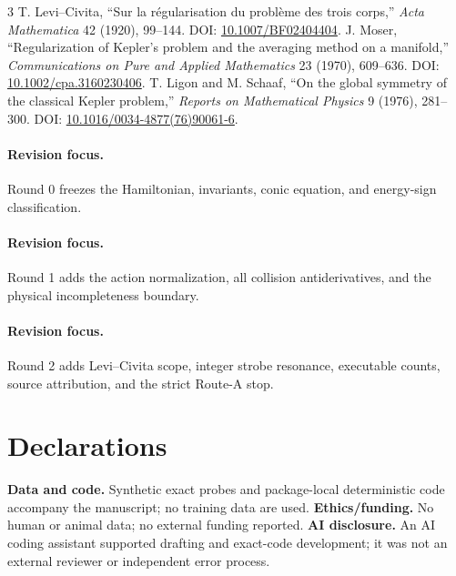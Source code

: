 \documentclass[9pt]{extarticle}
\begin{document}
\begin{thebibliography}{3}
\footnotesize
\setlength{\itemsep}{0pt}
 T. Levi--Civita, ``Sur la régularisation du problème des
trois corps,'' \emph{Acta Mathematica} 42 (1920), 99--144.
DOI: \href{https://doi.org/10.1007/BF02404404}{10.1007/BF02404404}.
 J. Moser, ``Regularization of Kepler's problem and the averaging
method on a manifold,'' \emph{Communications on Pure and Applied Mathematics}
23 (1970), 609--636.
DOI: \href{https://doi.org/10.1002/cpa.3160230406}{10.1002/cpa.3160230406}.
 T. Ligon and M. Schaaf, ``On the global symmetry of the
classical Kepler problem,'' \emph{Reports on Mathematical Physics} 9 (1976),
281--300.
DOI: \href{https://doi.org/10.1016/0034-4877(76)90061-6}{10.1016/0034-4877(76)90061-6}.
\end{thebibliography}
\fi

\ifcase\CRevisionRound
\paragraph{Revision focus.} Round 0 freezes the Hamiltonian, invariants,
conic equation, and energy-sign classification.
\or
\paragraph{Revision focus.} Round 1 adds the action normalization, all collision
antiderivatives, and the physical incompleteness boundary.
\or
\paragraph{Revision focus.} Round 2 adds Levi--Civita scope, integer strobe
resonance, executable counts, source attribution, and the strict Route-A stop.
\fi

\section*{Declarations}
\textbf{Data and code.} Synthetic exact probes and package-local deterministic
code accompany the manuscript; no training data are used.\quad
\textbf{Ethics/funding.} No human or animal data; no external funding reported.\quad
\textbf{AI disclosure.} An AI coding assistant supported drafting and exact-code
development; it was not an external reviewer or independent error process.
\end{document}
